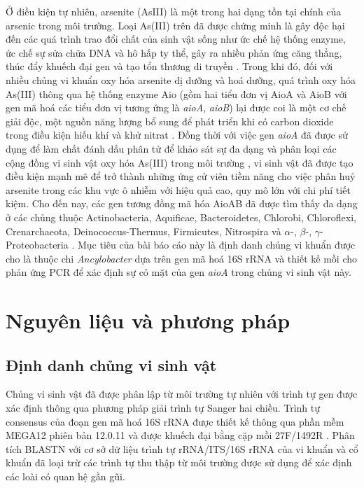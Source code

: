 \documentclass[journal]{IEEEtran}
\begin{document}
	Ở điều kiện tự nhiên, arsenite (AsIII) là một trong hai dạng tồn tại chính của arsenic trong môi trường. Loại As(III) trên đã được chứng minh là gây độc hại đến các quá trình trao đổi chất của sinh vật sống như ức chế hệ thống enzyme, ức chế sự sửa chữa DNA và hô hấp ty thể, gây ra nhiều phản ứng căng thẳng, thúc đẩy khuếch đại gen và tạo tổn thương di truyền \cite{snow1999modulation}. Trong khi đó, đối với nhiều chủng vi khuẩn oxy hóa arsenite dị dưỡng và hoá dưỡng, quá trình oxy hóa As(III) thông qua hệ thống enzyme Aio (gồm hai tiểu đơn vị AioA và AioB với gen mã hoá các tiểu đơn vị tương ứng là \textit{aioA}, \textit{aioB}) \cite{mukhopadhyay2002microbial, yamamura2014microbiology} lại được coi là một cơ chế giải độc, một nguồn năng lượng bổ sung để phát triển khi có carbon dioxide trong điều kiện hiếu khí \cite{bryan2009carbon,duquesne2008arsenite,garcia2008novel,santini2000new} và khử nitrat \cite{oremland2002anaerobic}. Đồng thời với việc gen \textit{aioA} đã được sử dụng để làm chất đánh dấu phân tử để khảo sát sự đa dạng và phân loại các cộng đồng vi sinh vật oxy hóa As(III) trong môi trường \cite{zhang2017nitrate, xue2020microbial, zhai2020abundance}, vi sinh vật đã được tạo điều kiện mạnh mẽ để trở thành những ứng cử viên tiềm năng cho việc phân huỷ arsenite trong các khu vực ô nhiễm với hiệu quả cao, quy mô lớn với chi phí tiết kiệm. Cho đến nay, các gen tương đồng mã hóa AioAB đã được tìm thấy đa dạng ở các chủng thuộc Actinobacteria, Aquificae, Bacteroidetes, Chlorobi, Chloroflexi, Crenarchaeota, Deinococcus-Thermus, Firmicutes, Nitrospira và  $\alpha$-, $\beta$-, $\gamma$-Proteobacteria \cite{yamamura2014microbiology}. Mục tiêu của bài báo cáo này là định danh chủng vi khuẩn được cho là thuộc chi \textit{Ancylobacter} dựa trên gen mã hoá 16S rRNA và thiết kế mồi cho phản ứng PCR để xác định sự có mặt của gen \textit{aioA} trong chủng vi sinh vật này.
	
	\section{Nguyên liệu và phương pháp}
	
	\subsection{Định danh chủng vi sinh vật}
	
	Chủng vi sinh vật đã được phân lập từ môi trường tự nhiên với trình tự gen được xác định thông qua phương pháp giải trình tự Sanger hai chiều. Trình tự consensus của đoạn gen mã hoá 16S rRNA được thiết kế thông qua phần mềm {\footnotesize MEGA12} phiên bản 12.0.11 \cite{kumar2024mega12} và được khuếch đại bằng cặp mồi 27F/1492R \cite{frank2008critical}. Phân tích {\footnotesize BLASTN} với cơ sở dữ liệu trình tự rRNA/ITS/16S rRNA của vi khuẩn và cổ khuẩn đã loại trừ các trình tự thu thập từ môi trường \cite{altschul1990basic} được sử dụng để xác định các loài có quan hệ gần gũi.
	
\end{document}
